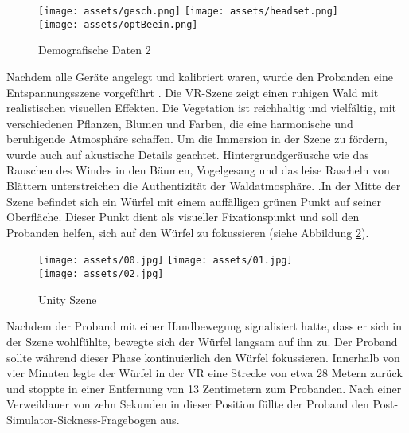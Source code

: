 \documentclass[conference]{IEEEtran}
\begin{document}
\begin{figure}[ht]
	\centering
	\texttt{[image: assets/gesch.png]} \hspace{-5pt}
	\texttt{[image: assets/headset.png]} \\
	\vspace{2pt}
	\texttt{[image: assets/optBeein.png]} 
	\caption{Demografische Daten 2}
	\label{fig:Demografische Daten 2}
\end{figure}

Nachdem alle Geräte angelegt und kalibriert waren, wurde den Probanden eine Entspannungsszene vorgeführt \cite{b11}. Die VR-Szene zeigt einen ruhigen Wald mit realistischen visuellen Effekten. Die Vegetation ist reichhaltig und vielfältig, mit verschiedenen Pflanzen, Blumen und Farben, die eine harmonische und beruhigende Atmosphäre schaffen. Um die Immersion in der Szene zu fördern, wurde auch auf akustische Details geachtet. Hintergrundgeräusche wie das Rauschen des Windes in den Bäumen, Vogelgesang und das leise Rascheln von Blättern unterstreichen die Authentizität der Waldatmosphäre. .In der Mitte der Szene befindet sich ein Würfel mit einem auffälligen grünen Punkt auf seiner Oberfläche. Dieser Punkt dient als visueller Fixationspunkt und soll den Probanden helfen, sich auf den Würfel zu fokussieren (siehe Abbildung \ref{fig:unity_scene}).

\begin{figure}[ht]
	\centering
	\texttt{[image: assets/00.jpg]} \hspace{-5pt}
	\texttt{[image: assets/01.jpg]} \\
	\vspace{2pt}
	\texttt{[image: assets/02.jpg]} \hspace{-5pt}
	\caption{Unity Szene}
	\label{fig:unity_scene}
\end{figure}

Nachdem der Proband mit einer Handbewegung signalisiert hatte, dass er sich in der Szene wohlfühlte, bewegte sich der Würfel langsam auf ihn zu. Der Proband sollte während dieser Phase kontinuierlich den Würfel fokussieren. Innerhalb von vier Minuten legte der Würfel in der VR eine Strecke von etwa 28 Metern zurück und stoppte in einer Entfernung von 13 Zentimetern zum Probanden. Nach einer Verweildauer von zehn Sekunden in dieser Position füllte der Proband den Post-Simulator-Sickness-Fragebogen aus.
\end{document}
